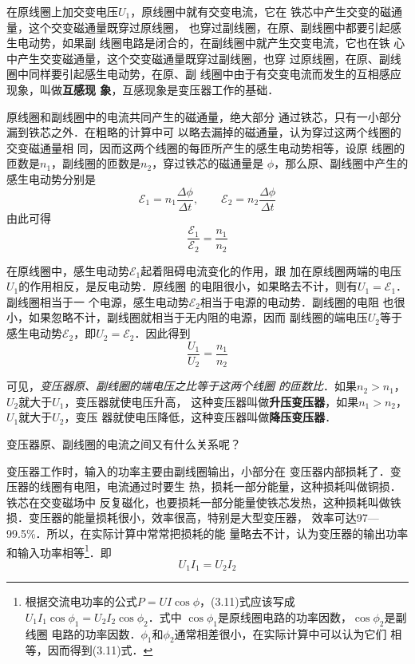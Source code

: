 在原线圈上加交变电压$U_1$，原线圈中就有交变电流，它在
铁芯中产生交变的磁通量，这个交变磁通量既穿过原线圈，
也穿过副线圈，在原、副线圈中都要引起感生电动势，如果副
线圈电路是闭合的，在副线圈中就产生交变电流，它也在铁
心中产生交变磁通量，这个交变磁通量既穿过副线圈，也穿
过原线圈，在原、副线圈中同样要引起感生电动势，在原、副
线圈中由于有交变电流而发生的互相感应现象，叫做\textbf{互感现
象}，互感现象是变压器工作的基础．

原线圈和副线圈中的电流共同产生的磁通量，绝大部分
通过铁芯，只有一小部分漏到铁芯之外．在粗略的计算中可
以略去漏掉的磁通量，认为穿过这两个线圈的交变磁通量相
同，因而这两个线圈的每匝所产生的感生电动势相等，设原
线圈的匝数是$n_1$，副线圈的匝数是$n_2$，穿过铁芯的磁通量是
$\phi$，那么原、副线圈中产生的感生电动势分别是
\[\mathcal{E}_1=n_1\frac{\Delta \phi}{\Delta t},\qquad  \mathcal{E}_2=n_2\frac{\Delta \phi}{\Delta t}\]
由此可得
\begin{equation}
    \frac{\mathcal{E}_1}{\mathcal{E}_2}=\frac{n_1}{n_2} 
\end{equation}

在原线圈中，感生电动势$\mathcal{E}_1$起着阻碍电流变化的作用，跟
加在原线圈两端的电压$U_1$的作用相反，是反电动势．原线圈
的电阻很小，如果略去不计，则有$U_1=\mathcal{E}_1$．副线圈相当于一
个电源，感生电动势$\mathcal{E}_2$相当于电源的电动势．副线圈的电阻
也很小，如果忽略不计，副线圈就相当于无内阻的电源，因而
副线圈的端电压$U_2$等于感生电动势$\mathcal{E}_2$，即$U_2=\mathcal{E}_2$．因此得到
\begin{equation}
    \frac{U_1}{U_2}=\frac{n_1}{n_2} 
\end{equation}

可见，\textit{变压器原、副线圈的端电压之比等于这两个线圈
的匝数比}．如果$n_2>n_1$，$U_2$就大于$U_1$，变压器就使电压升高，
这种变压器叫做\textbf{升压变压器}，如果$n_1>n_2$，$U_1$就大于$U_2$，变压
器就使电压降低，这种变压器叫做\textbf{降压变压器}．

变压器原、副线圈的电流之间又有什么关系呢？

变压器工作时，输入的功率主要由副线圈输出，小部分在
变压器内部损耗了．变压器的线圈有电阻，电流通过时要生
热，损耗一部分能量，这种损耗叫做铜损．铁芯在交变磁场中
反复磁化，也要损耗一部分能量使铁芯发热，这种损耗叫做铁
损．变压器的能量损耗很小，效率很高，特别是大型变压器，
效率可达97—99.5\%．所以，在实际计算中常常把损耗的能
量略去不计，认为变压器的输出功率和输入功率相等\footnote{根据交流电功率的公式$P=UI\cos\phi$，(3.11)式应该写成$U_1I_1\cos\phi_1
=U_2I_2\cos\phi_2$．式中 $\cos\phi_1$是原线圈电路的功率因数，$\cos\phi_2$是副线圈
电路的功率因数．$\phi_1$和$\phi_2$通常相差很小，在实际计算中可以认为它们
相等，因而得到(3.11)式．}．即
\begin{equation}
    U_1I_1=U_2I_2
\end{equation}

